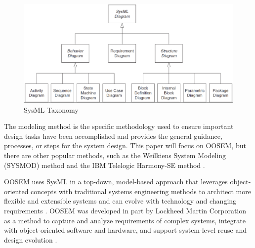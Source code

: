 \documentclass[conference]{joss-pretty}
\begin{document}
\begin{figure}
    \centering
    \includegraphics[width=\textwidth]{Figures/sysML taxonomy.png}
    \caption{SysML Taxonomy}
    \label{fig:SysML Taxonomy}
\end{figure}

The modeling method is the specific methodology used to ensure important design tasks have been accomplished and provides the general guidance, processes, or steps for the system design. This paper will focus on OOSEM, but there are other popular methods, such as the Weilkiens System Modeling (SYSMOD) method and the IBM Telelogic Harmony-SE method \citep{Delligatti}. 

OOSEM uses SysML in a top-down, model-based approach that leverages object-oriented concepts with traditional systems engineering methods to architect more flexible and extensible systems and can evolve with technology and changing requirements \citep{Estefan2008}. OOSEM was developed in part by Lockheed Martin Corporation as a method to capture and analyze requirements of complex systems, integrate with object-oriented software and hardware, and support system-level reuse and design evolution \citep{INCOSEhandbook}. 
\end{document}
